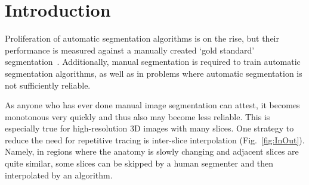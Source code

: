 \documentclass{InsightArticle}
\newcommand{\IJhandlerIDnumber}{1338}
\begin{document}
\IJhandlenote{\IJhandlerIDnumber}

\newpage

\tableofcontents


\section{Introduction}

Proliferation of automatic segmentation algorithms is on the rise,
but their performance is measured against a manually created `gold standard' segmentation~\cite{py06nimg}.
Additionally, manual segmentation is required to train automatic segmentation algorithms,
as well as in problems where automatic segmentation is not sufficiently reliable.

As anyone who has ever done manual image segmentation can attest,
it becomes monotonous very quickly and thus also may become less reliable.
This is especially true for high-resolution 3D images with many slices.
One strategy to reduce the need for repetitive tracing is inter-slice interpolation (Fig.~\ref{fig:InOut}).
Namely, in regions where the anatomy is slowly changing and adjacent slices are quite similar,
some slices can be skipped by a human segmenter and then interpolated by an algorithm.
\end{document}
